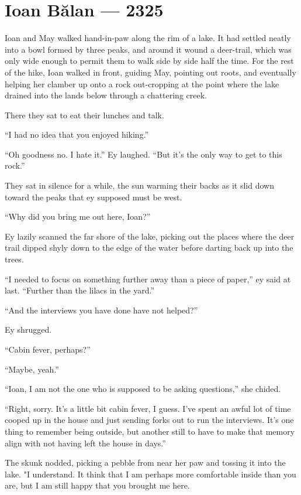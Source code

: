 \hypertarget{ioan-bux103lan-2325}{%
\chapter{Ioan Bălan — 2325}\label{ioan-bux103lan-2325}}

Ioan and May walked hand-in-paw along the rim of a lake. It had settled neatly into a bowl formed by three peaks, and around it wound a deer-trail, which was only wide enough to permit them to walk side by side half the time. For the rest of the hike, Ioan walked in front, guiding May, pointing out roots, and eventually helping her clamber up onto a rock out-cropping at the point where the lake drained into the lands below through a chattering creek.

There they sat to eat their lunches and talk.

``I had no idea that you enjoyed hiking.''

``Oh goodness no. I hate it.'' Ey laughed. ``But it's the only way to get to this rock.''

They sat in silence for a while, the sun warming their backs as it slid down toward the peaks that ey supposed must be west.

``Why did you bring me out here, Ioan?''

Ey lazily scanned the far shore of the lake, picking out the places where the deer trail dipped shyly down to the edge of the water before darting back up into the trees.

``I needed to focus on something further away than a piece of paper,'' ey said at last. ``Further than the lilacs in the yard.''

``And the interviews you have done have not helped?''

Ey shrugged.

``Cabin fever, perhaps?''

``Maybe, yeah.''

``Ioan, I am not the one who is supposed to be asking questions,'' she chided.

``Right, sorry. It's a little bit cabin fever, I guess. I've spent an awful lot of time cooped up in the house and just sending forks out to run the interviews. It's one thing to remember being outside, but another still to have to make that memory align with not having left the house in days.''

The skunk nodded, picking a pebble from near her paw and tossing it into the lake. "I understand. It think that I am perhaps more comfortable inside than you are, but I am still happy that you brought me here.

